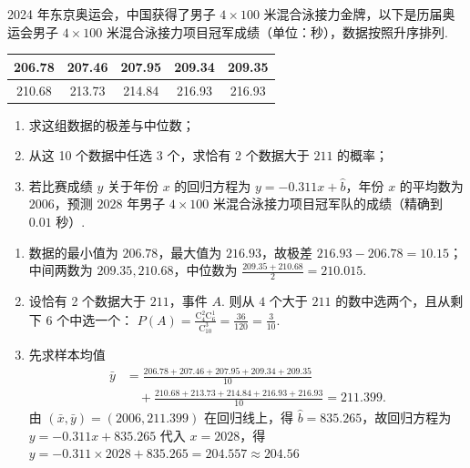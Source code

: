 \begin{problem}
2024 年东京奥运会，中国获得了男子 \(4\times100\) 米混合泳接力金牌，以下是历届奥运会男子 \(4\times100\) 米混合泳接力项目冠军成绩（单位：秒），数据按照升序排列.

\begin{center}
\begin{tabular}{|c|c|c|c|c|}
\hline
206.78 & 207.46 & 207.95 & 209.34 & 209.35 \\
\hline
210.68 & 213.73 & 214.84 & 216.93 & 216.93 \\
\hline
\end{tabular}
\end{center}

\begin{enumerate}
\item 求这组数据的极差与中位数；
\item 从这 10 个数据中任选 3 个，求恰有 2 个数据大于 \(211\) 的概率；
\item 若比赛成绩 \(y\) 关于年份 \(x\) 的回归方程为 \(y=-0.311x+\hat b\)，年份 \(x\) 的平均数为 \(2006\)，预测 \(2028\) 年男子 \(4\times100\) 米混合泳接力项目冠军队的成绩（精确到 \(0.01\) 秒）.
\end{enumerate}
\end{problem}

\begin{solution}
\begin{enumerate}
\item 数据的最小值为 \(206.78\)，最大值为 \(216.93\)，故极差 \(216.93-206.78=10.15\)；中间两数为 \(209.35,210.68\)，中位数为 \(\frac{209.35+210.68}{2}=210.015\).

\item 设恰有 2 个数据大于 \(211\)，事件 \(A\). 则从 \(4\) 个大于 \(211\) 的数中选两个，且从剩下 \(6\) 个中选一个：
\(P(A)=\frac{\mathrm C_4^2\mathrm C_6^1}{\mathrm C_{10}^3}=\frac{36}{120}=\frac3{10}\).

\item 先求样本均值
\[
\begin{aligned}
\bar y
&=\frac{206.78+207.46+207.95+209.34+209.35}{10}\\
&\quad+\frac{210.68+213.73+214.84+216.93+216.93}{10}=211.399.
\end{aligned}
\]
由 \((\bar x,\bar y)=(2006,211.399)\) 在回归线上，得 \(\hat b=835.265\)，故回归方程为
\(
y=-0.311x+835.265
\)
代入 \(x=2028\)，得
\(
y=-0.311\times2028+835.265 =204.557\approx204.56
\)
\end{enumerate}
\end{solution}

